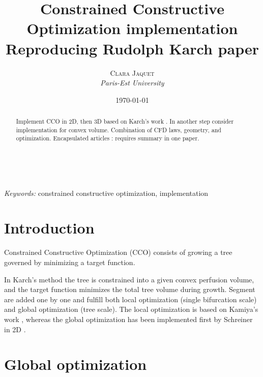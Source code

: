 \documentclass[a4paper, 11pt]{article} %
\title{\textbf{Constrained Constructive Optimization implementation}\\ %
Reproducing Rudolph Karch paper} %
\author{\textsc{Clara Jaquet} %
\\{\textit{Paris-Est University}}} %
\date{\today} %
\makeatletter
\renewcommand{\maketitle}{ %
\begin{flushright} %
{\LARGE\@title} %

\vspace{50pt} %

{\large\@author} %
\\\@date %

\vspace{40pt} %
\end{flushright}
}
\makeatother
\begin{document}
\maketitle %



\begin{abstract}
Implement CCO in 2D, then 3D based on Karch's work \cite{karch1999three}. In another step consider implementation for convex volume. 
Combination of CFD laws, geometry, and optimization. Encapsulated articles : requires summary in one paper.
\end{abstract}

\hspace*{3,6mm}\textit{Keywords:} constrained constructive optimization, implementation %

\vspace{30pt} %

\tableofcontents

\section*{Introduction}

Constrained Constructive Optimization (CCO) consists of growing a tree governed by minimizing a target function. 

In Karch's method the tree is constrained into a given convex perfusion volume, and the target function minimizes the total tree volume during growth. Segment are added one by one and fulfill both local optimization (single bifurcation scale) and global optimization (tree scale). The local optimization is based on Kamiya's work \cite{kamiya1972optimal}, whereas the global optimization has been implemented first by Schreiner in 2D \cite{schreiner1993computer}. 

\section{Global optimization}
\end{document}

